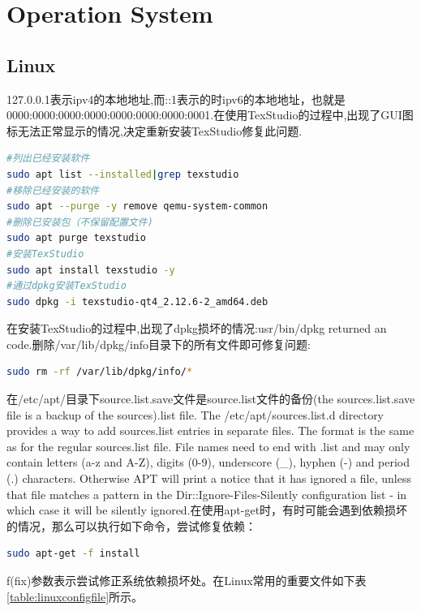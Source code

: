 \documentclass[12pt]{book}
\numberwithin{dummy}{section}
\theoremstyle{ocrenumbox}
\theoremstyle{blacknumex}
\theoremstyle{blacknumbox}
\theoremstyle{ocrenum}
\begin{document}
\clearpage

\part{Operation System}

\chapter{Linux}

127.0.0.1表示ipv4的本地地址,而::1表示的时ipv6的本地地址，也就是0000:0000:0000:0000:0000:0000:0000:0001.在使用TexStudio的过程中,出现了GUI图标无法正常显示的情况,决定重新安装TexStudio修复此问题.

\begin{lstlisting}[language=Bash]
#列出已经安装软件
sudo apt list --installed|grep texstudio
#移除已经安装的软件
sudo apt --purge -y remove qemu-system-common 
#删除已安装包（不保留配置文件)
sudo apt purge texstudio
#安装TexStudio
sudo apt install texstudio -y
#通过dpkg安装TexStudio
sudo dpkg -i texstudio-qt4_2.12.6-2_amd64.deb 
\end{lstlisting}

在安装TexStudio的过程中,出现了dpkg损坏的情况:usr/bin/dpkg returned an code.删除/var/lib/dpkg/info目录下的所有文件即可修复问题:

\begin{lstlisting}[language=Bash]
sudo rm -rf /var/lib/dpkg/info/*
\end{lstlisting}

在/etc/apt/目录下source.list.save文件是source.list文件的备份(the sources.list.save file is a backup of the sources).list file. The /etc/apt/sources.list.d directory provides a way to add sources.list entries in separate files. The format is the same as for the regular sources.list file. File names need to end with .list and may only contain letters (a-z and A-Z), digits (0-9), underscore (\_), hyphen (-) and period (.) characters. Otherwise APT will print a notice that it has ignored a file, unless that file matches a pattern in the Dir::Ignore-Files-Silently configuration list - in which case it will be silently ignored.在使用apt-get时，有时可能会遇到依赖损坏的情况，那么可以执行如下命令，尝试修复依赖：

\begin{lstlisting}[language=Bash]
sudo apt-get -f install 
\end{lstlisting}

f(fix)参数表示尝试修正系统依赖损坏处。在Linux常用的重要文件如下表\ref{table:linuxconfigfile}所示。
\end{document}
